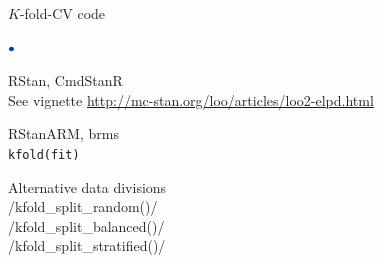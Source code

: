 \documentclass[english,t]{beamer}
\newenvironment{list1}{
   \begin{list}{$\color{list1}\bullet$}{\itemsep=6pt}}{
  \end{list}}
\begin{document}
\begin{frame}{}
  
\end{frame}

\begin{frame}{$K$-fold-CV code}

  \begin{list1}
  \item RStan, CmdStanR\\
    See vignette \url{http://mc-stan.org/loo/articles/loo2-elpd.html}
  \item RStanARM, brms\\
    \texttt{kfold(fit)}
  \item Alternative data divisions\\
  \rinline/kfold_split_random()/\\
  \rinline/kfold_split_balanced()/\\
  \rinline/kfold_split_stratified()/
  \end{list1}
  
\end{frame}
\end{document}
